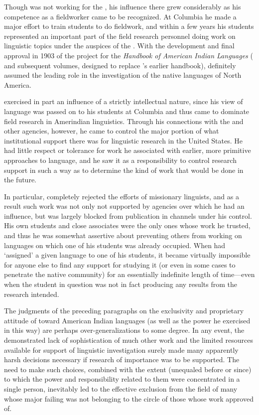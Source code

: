 Though {\Boas} was not working for the , his influence there grew
considerably as his {competence} as a fieldworker came to be
recognized. At Columbia he made a major effort to train students to do
fieldwork, and within a few years his students represented an
important part of the field research personnel doing work on
linguistic topics under the auspices of the . With the development
and final approval in 1903 of the project for the \textsl{Handbook of
  American Indian Languages} (\citealt{boas:handbook_1} and subsequent
volumes, designed to replace {\Powell}'s earlier handbook), {\Boas}
definitely assumed the leading role in the investigation of the native
languages of North America.

{\Boas} exercised in part an influence of a strictly intellectual nature,
since his view of language was passed on to his students at Columbia
and thus came to dominate field research in Amerindian
linguistics. Through his connections with the  and other agencies,
however, he came to control the major portion of what institutional
support there was for linguistic research in the United States. He had
little respect or tolerance for work he associated with earlier, more
primitive approaches to language, and he saw it as a responsibility to
control research support in such a way as to determine the kind of
work that would be done in the future.

In particular, {\Boas} completely rejected the efforts of missionary
linguists, and as a result such work was not only not supported by
agencies over which he had an influence, but was largely blocked from
publication in channels under his control. His own students and close
associates were the only ones whose work he trusted, and thus he was
somewhat assertive about preventing others from working on languages
on which one of his students was already occupied. When {\Boas} had
`assigned' a given language to one of his students, it became
virtually impossible for anyone else to find any support for studying
it (or even in some cases to penetrate the native community) for an
essentially indefinite length of time—even when the student in
question was not in fact producing any results from the research
intended.

The judgments of the preceding paragraphs on the exclusivity and
proprietary attitude of {\Boas} toward American Indian languages (as well
as the power he exercised in this way) are perhaps
over-generalizations to some degree. In any event, the demonstrated
lack of sophistication of much other work and the limited resources
available for support of linguistic investigation surely made many
apparently harsh decisions necessary if research of importance was to
be supported. The need to make such choices, combined with the extent
(unequaled before or since) to which the power and responsibility
related to them were concentrated in a single person, inevitably led
to the effective exclusion from the field of many whose major failing
was not belonging to the circle of those whose work {\Boas} approved of.

